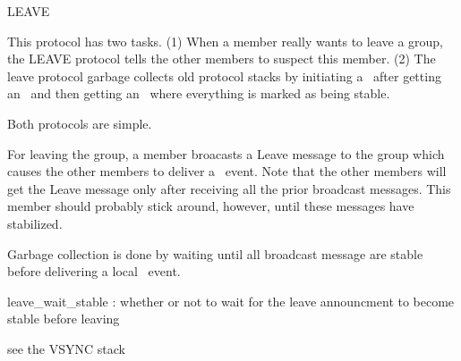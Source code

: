 \begin{Layer}{LEAVE}

This protocol has two tasks.  (1) When a member really wants to leave a group,
the LEAVE protocol tells the other members to suspect this member.  (2) The
leave protocol garbage collects old protocol stacks by initiating a \DnLeave\
after getting an \UpView\ and then getting an \UpStable\ where everything is
marked as being stable.

\begin{Protocol}
Both protocols are simple.

For leaving the group, a member broacasts a Leave message to the group
which causes the other members to deliver a \DnSuspect\ event.  Note that
the other members will get the Leave message only after receiving all the
prior broadcast messages.  This member should probably stick around,
however, until these messages have stabilized.

Garbage collection is done by waiting until all broadcast message are
stable before delivering a local \DnLeave\ event.
\end{Protocol}

\begin{Parameters}
\item
leave\_wait\_stable : whether or not to wait for the leave announcment to
become stable before leaving
\end{Parameters}

\begin{Properties}
\item \todo{}
\end{Properties}

\begin{Sources}
\end{Sources}

\begin{GenEvent}
\genevent{\DnLeave}
\end{GenEvent}

\begin{Testing}
\item see the VSYNC stack
\end{Testing}
\end{Layer}
